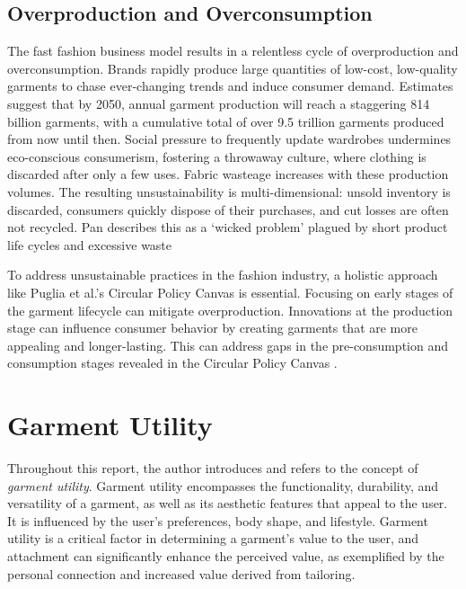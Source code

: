 \subsection{Overproduction and Overconsumption}
The fast fashion business model results in a relentless cycle of overproduction and overconsumption. Brands rapidly produce large quantities of low-cost, low-quality garments to chase ever-changing trends and induce consumer demand. Estimates suggest that by 2050, annual garment production will reach a staggering 814 billion garments, with a cumulative total of over 9.5 trillion garments produced from now until then. Social pressure to frequently update wardrobes undermines eco-conscious consumerism, fostering a throwaway culture, where clothing is discarded after only a few uses. Fabric wasteage increases with these production volumes. The resulting unsustainability is multi-dimensional: unsold inventory is discarded, consumers quickly dispose of their purchases, and cut losses are often not recycled. Pan describes this as a `wicked problem' plagued by short product life cycles and excessive waste \cite{charter_accelerating_2024}

To address unsustainable practices in the fashion industry, a holistic approach like Puglia et al.'s Circular Policy Canvas is essential. Focusing on early stages of the garment lifecycle can mitigate overproduction. Innovations at the production stage can influence consumer behavior by creating garments that are more appealing and longer-lasting. This can address gaps in the pre-consumption and consumption stages revealed in the Circular Policy Canvas \cite{puglia_circular_2024}.

\section{Garment Utility}
Throughout this report, the author introduces and refers to the concept of \textit{garment utility}. Garment utility encompasses the functionality, durability, and versatility of a garment, as well as its aesthetic features that appeal to the user. It is influenced by the user's preferences, body shape, and lifestyle. Garment utility is a critical factor in determining a garment's value to the user, and attachment can significantly enhance the perceived value, as exemplified by the personal connection and increased value derived from tailoring.

